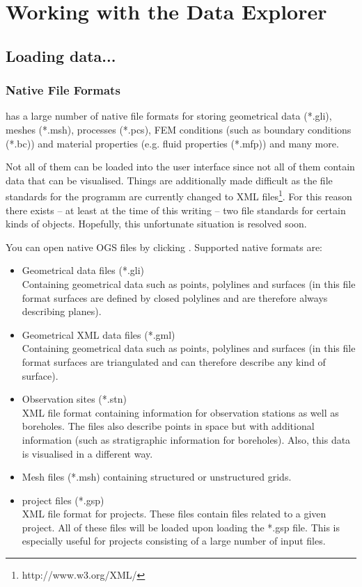 \chapter{Working with the Data Explorer}

\section{Loading data...}

\subsection{Native File Formats}
\label{nativefileformats}

\ogs has a large number of native file formats for storing geometrical data (*.gli), meshes (*.msh), processes (*.pcs), FEM conditions (such as boundary conditions (*.bc)) and material properties (e.g. fluid properties (*.mfp)) and many more.

Not all of them can be loaded into the user interface since not all of them contain data that can be visualised. Things are additionally made difficult as the file standards for the programm are currently changed to XML files\footnote{http://www.w3.org/XML/}. For this reason there exists -- at least at the time of this writing -- two file standards for certain kinds of objects. Hopefully, this unfortunate situation is resolved soon.

You can open native OGS files by clicking . Supported native \ogs formats are:
\begin{itemize}
\item Geometrical data files (*.gli)\\
    Containing geometrical data such as points, polylines and surfaces (in this file format surfaces are defined by closed polylines and are therefore always describing planes).
\item Geometrical XML data files (*.gml)\\
    Containing geometrical data such as points, polylines and surfaces (in this file format surfaces are triangulated and can therefore describe any kind of surface).
\item Observation sites (*.stn)\\
    XML file format containing information for observation stations as well as boreholes. The files also describe points in space but with additional information (such as stratigraphic information for boreholes). Also, this data is visualised in a different way.
\item Mesh files (*.msh) containing structured or unstructured grids.
\item \ogs project files (*.gsp)\\
    XML file format for \ogs projects. These files contain files related to a given project. All of these files will be loaded upon loading the *.gsp file. This is especially useful for projects consisting of a large number of input files.
\end{itemize}

